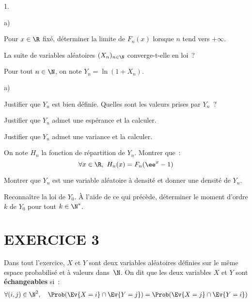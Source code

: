 \documentclass[11pt]{article}%
\begin{document}
\begin{noliste}{1.}
\begin{noliste}{a)}
\item Pour $x \in \R$ fixé, déterminer la limite de $F_n(x)$  
lorsque $n$ tend vers $+\infty$.




\item La suite de variables aléatoires $(X_n)_{n \in \N}$ 
converge-t-elle en loi~?



\end{noliste}

\item Pour tout $n \in \N$, on note $Y_n = \ln(1+X_n)$.
\begin{noliste}{a)}
\item Justifier que $Y_n$ est bien définie. Quelles sont les valeurs 
prises par $Y_n$~?





\item Justifier que $Y_n$ admet une espérance et la calculer.




\item Justifier que $Y_n$ admet une variance et la calculer.

  


\item On note $H_n$ la fonction de répartition de $Y_n$. Montrer que~:
\[ 
\forall x \in \R, \ H_n(x) = F_n(\ee^x-1) 
\]




\item Montrer que $Y_n$ est une variable aléatoire à densité et donner
  une densité de $Y_n$.






\item Reconnaître la loi de $Y_0$. À l'aide de ce qui précède,
  déterminer le moment d'ordre $k$ de $Y_0$ pour tout $k \in \N^*$.

  
\end{noliste}
\end{noliste}




\section*{EXERCICE 3}

\noindent
Dans tout l'exercice, $X$ et $Y$ sont deux variables aléatoires
définies sur le même espace probabilisé et à valeurs dans~$\N$. On dit
que les deux variables $X$ et $Y$ sont \textbf{échangeables} si~:
\[ 
\forall (i, j) \in \N^2, \quad \Prob(\Ev{X=i} \cap \Ev{Y=j}) = 
\Prob(\Ev{X=j} \cap \Ev{Y=i}) 
\]
\end{document}
